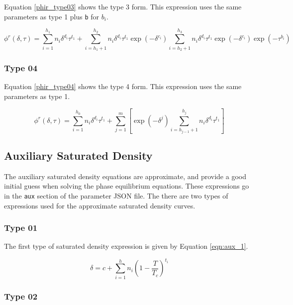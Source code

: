 \documentclass[oneside]{book}
\begin{document}
Equation \ref{phir_type03} shows the type 3 form.  This expression uses the same parameters as type 1 plus \texttt{b} for $b_i$.

\begin{equation}\label{phir_type03}
	\phi^r(\delta, \tau) = 
	\sum^{h_1}_{i=1} n_i \delta^{d_i} \tau^{t_1} + 
	\sum_{i=h_1 + 1}^{h_2} n_i \delta^{d_i} \tau^{t_1} \exp(-\delta^{c_i})
	\sum_{i=h_2 + 1}^{h_3} n_i \delta^{d_i} \tau^{t_1} \exp(-\delta^{c_i}) \exp(-\tau^{b_i})
\end{equation}

\subsubsection{Type 04}

Equation \ref{phir_type04} shows the type 4 form. This expression uses the same parameters as type 1.

\begin{equation}\label{phir_type04}
	\phi^r(\delta, \tau) = 
	\sum^{h_0}_{i=1} n_i \delta^{d_i} \tau^{t_1} + 
	\sum^m_{j=1} \left[ \exp(-\delta^j) \sum^{h_j}_{i = h_{j-1} + 1} n_i \delta^{d_i} \tau^{t_1} \right]
\end{equation}

\subsection{Auxiliary Saturated Density}

The auxiliary saturated density equations are approximate, and provide a good initial guess when solving the phase equilibrium equations.  These expressions go in the \texttt{aux} section of the parameter JSON file. The there are two types of expressions used for the approximate saturated density curves.

\subsubsection{Type 01}

The first type of saturated density expression is given by Equation \ref{eqn:aux_1}.

\begin{equation}\label{eqn:aux_1}
	\delta = c + \sum_{i=1}^h n_i  \left(1 - \frac{T}{T_c} \right)^{t_i}
\end{equation}

\subsubsection{Type 02}
\end{document}
